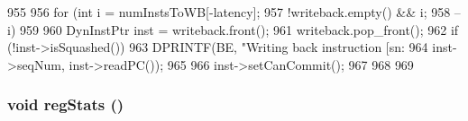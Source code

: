 \begin{DoxyCode}
955 {
956     for (int i = numInstsToWB[-latency];
957          !writeback.empty() && i;
958          --i)
959     {
960         DynInstPtr inst = writeback.front();
961         writeback.pop_front();
962         if (!inst->isSquashed()) {
963             DPRINTF(BE, "Writing back instruction [sn:%
964                     inst->seqNum, inst->readPC());
965 
966             inst->setCanCommit();
967         }
968     }
969 }
\end{DoxyCode}
\hypertarget{classLWBackEnd_a4dc637449366fcdfc4e764cdf12d9b11}{
\subsubsection[{regStats}]{\setlength{\rightskip}{0pt plus 5cm}void regStats ()}}
\label{classLWBackEnd_a4dc637449366fcdfc4e764cdf12d9b11}



